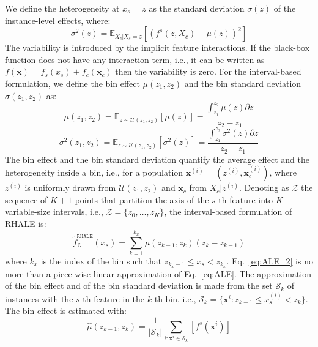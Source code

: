 \documentclass{ecai}  %
\newcommand{\dfdx}{f^s}
\newcommand{\xc}{\mathbf{x}_c}
\newcommand{\xb}{\mathbf{x}}
\begin{document}
We define the heterogeneity at \(x_s=z\) as the standard deviation $\sigma(z)$
of the instance-level effects, where:
%
\begin{equation}
  \label{eq:ALE_var}
  \sigma^2(z) = \mathbb{E}_{X_c|X_s=z}\left [ \left (\dfdx (z, X_c) - \mu(z) \right )^2 \right ]
\end{equation}
%
The variability is introduced by the implicit feature interactions.
If the black-box function does not have any interaction term, i.e.,
it can be written as $f(\xb) = f_s(x_s) + f_c(\xc)$ then the variability is zero.
For the interval-based formulation, we define the bin effect
\(\mu(z_1, z_2)\) and the bin standard deviation \(\sigma(z_1, z_2)\) as:
%
\begin{equation}
  \label{eq:mu_bin}
    \mu(z_1, z_2) = \mathbb{E}_{z \sim \mathcal{U}(z_1,z_2)} [\mu(z)]
    = \frac{\int_{z_1}^{z_2} \mu(z) \partial z}{z_2 - z_1}
\end{equation}
%
\begin{equation}
  \label{eq:var_bin}
  \sigma^2(z_1, z_2) = \mathbb{E}_{z \sim \mathcal{U}(z_1,z_2)} [\sigma^2(z)] =  \frac{\int_{z_1}^{z_2} \sigma^2(z)  \partial z}{z_2 - z_1}
\end{equation}
%
The bin effect and the bin standard deviation quantify the average effect and
the heterogeneity inside a bin, i.e., for a population
\(\xb^{(i)} = (z^{(i)}, \xc^{(i)})\), where
\(z^{(i)}\) is uniformly drawn from \(\mathcal{U}(z_1, z_2)\) and
$\xc$ from $X_c|z^{(i)}$.
Denoting as \(\mathcal{Z}\) the sequence of
\(K+1\) points that partition the axis of the \(s\)-th feature into \(K\) variable-size
intervals, i.e., \(\mathcal{Z} = \{z_0, \ldots, z_K\}\),
the interval-based formulation of RHALE is:
%
\begin{equation}
  \label{eq:ALE_2}
  \tilde{f}^{\mathtt{RHALE}}_{\mathcal{Z}}(x_s) = \sum_{k=1}^{k_x} \mu(z_{k-1}, z_k) (z_k - z_{k-1})
\end{equation}
where \(k_x\) is the index of the bin such that
\( z_{k_x - 1} \leq x_s < z_{k_x}\).
Eq.~\eqref{eq:ALE_2} is no more than a
piece-wise linear approximation of Eq.~\eqref{eq:ALE}.
The approximation of the bin effect and of the bin standard deviation is made from the
set \(\mathcal{S}_k\) of instances with the \(s\)-th feature
in the \(k\)-th bin, i.e.,
\( \mathcal{S}_k= \{ \mathbf{x}^i : z_{k-1} \leq x^{(i)}_s < z_k \}
\).
The bin effect is estimated with:
%
\begin{equation}
  \label{eq:mu_bin_approx}
  \hat{\mu}(z_{k-1}, z_k) = \frac{1}{|\mathcal{S}_k|}
  \sum_{i:\mathbf{x}^i \in \mathcal{S}_k} \left [ \dfdx(\mathbf{x}^i)
  \right ]
\end{equation}
\end{document}
